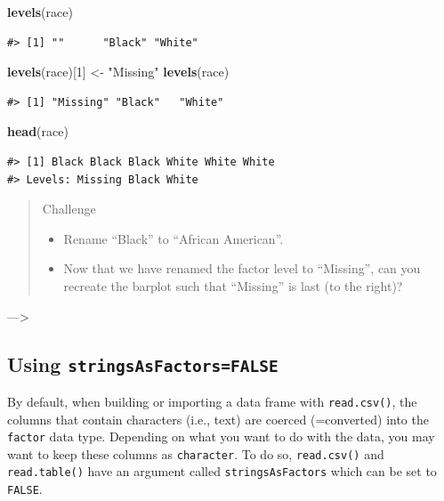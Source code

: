 \documentclass[]{book}
\newenvironment{Shaded}{\begin{snugshade}}{\end{snugshade}}
\newcommand{\KeywordTok}[1]{\textcolor[rgb]{0.13,0.29,0.53}{\textbf{{#1}}}}
\newcommand{\DecValTok}[1]{\textcolor[rgb]{0.00,0.00,0.81}{{#1}}}
\newcommand{\StringTok}[1]{\textcolor[rgb]{0.31,0.60,0.02}{{#1}}}
\newcommand{\NormalTok}[1]{{#1}}
\providecommand{\tightlist}{%
  \setlength{\itemsep}{0pt}\setlength{\parskip}{0pt}}
\theoremstyle{definition}
\theoremstyle{definition}
\theoremstyle{remark}
\begin{document}
\begin{Shaded}
\begin{Highlighting}[]
\KeywordTok{levels}\NormalTok{(race)}
\end{Highlighting}
\end{Shaded}

\begin{verbatim}
#> [1] ""      "Black" "White"
\end{verbatim}

\begin{Shaded}
\begin{Highlighting}[]
\KeywordTok{levels}\NormalTok{(race)[}\DecValTok{1}\NormalTok{] <-}\StringTok{ "Missing"}
\KeywordTok{levels}\NormalTok{(race)}
\end{Highlighting}
\end{Shaded}

\begin{verbatim}
#> [1] "Missing" "Black"   "White"
\end{verbatim}

\begin{Shaded}
\begin{Highlighting}[]
\KeywordTok{head}\NormalTok{(race)}
\end{Highlighting}
\end{Shaded}

\begin{verbatim}
#> [1] Black Black Black White White White
#> Levels: Missing Black White
\end{verbatim}

\begin{quote}
Challenge

\begin{itemize}
\tightlist
\item
  Rename ``Black'' to ``African American''.
\item
  Now that we have renamed the factor level to ``Missing'', can you
  recreate the barplot such that ``Missing'' is last (to the right)?
\end{itemize}
\end{quote}

---\textgreater{}

\subsection{\texorpdfstring{Using
\texttt{stringsAsFactors=FALSE}}{Using stringsAsFactors=FALSE}}\label{using-stringsasfactorsfalse}

By default, when building or importing a data frame with
\texttt{read.csv()}, the columns that contain characters (i.e., text)
are coerced (=converted) into the \texttt{factor} data type. Depending
on what you want to do with the data, you may want to keep these columns
as \texttt{character}. To do so, \texttt{read.csv()} and
\texttt{read.table()} have an argument called \texttt{stringsAsFactors}
which can be set to \texttt{FALSE}.
\end{document}
